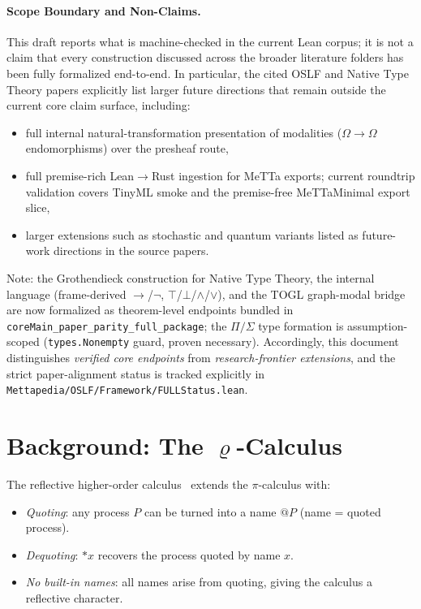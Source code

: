 \documentclass[]{article}
\newcommand{\code}[1]{\texttt{#1}}
\newcommand{\rhocalc}{\ensuremath{\varrho}}
\begin{document}
\paragraph{Scope Boundary and Non-Claims.}
This draft reports what is machine-checked in the current Lean corpus; it is
not a claim that every construction discussed across the broader literature
folders has been fully formalized end-to-end.  In particular, the cited OSLF and
Native Type Theory papers explicitly list larger future directions that remain
outside the current core claim surface, including:
\begin{itemize}
\item full internal natural-transformation presentation of modalities
  (\(\Omega \to \Omega\) endomorphisms) over the presheaf route,
\item full premise-rich Lean$\to$Rust ingestion for MeTTa exports;
  current roundtrip validation covers TinyML smoke and the premise-free
  MeTTaMinimal export slice,
\item larger extensions such as stochastic and quantum variants listed as
  future-work directions in the source papers.
\end{itemize}
Note: the Grothendieck construction for Native Type Theory, the internal
language (frame-derived $\to$/$\lnot$, $\top$/$\bot$/$\land$/$\lor$), and the
TOGL graph-modal bridge are now formalized as theorem-level endpoints bundled
in \code{coreMain\_paper\_parity\_full\_package}; the $\Pi/\Sigma$ type formation
is assumption-scoped (\code{types.Nonempty} guard, proven necessary).
Accordingly, this document distinguishes \emph{verified core endpoints} from
\emph{research-frontier extensions}, and the strict paper-alignment status is
tracked explicitly in \code{Mettapedia/OSLF/Framework/FULLStatus.lean}.

\section{Background: The \rhocalc{}-Calculus}

The reflective higher-order calculus~\cite{MeredithRadestock2005} extends the
$\pi$-calculus with:
\begin{itemize}
\item \emph{Quoting}: any process $P$ can be turned into a name $@P$ (name = quoted process).
\item \emph{Dequoting}: $*x$ recovers the process quoted by name $x$.
\item \emph{No built-in names}: all names arise from quoting, giving the calculus a
  reflective character.
\end{itemize}
\end{document}
